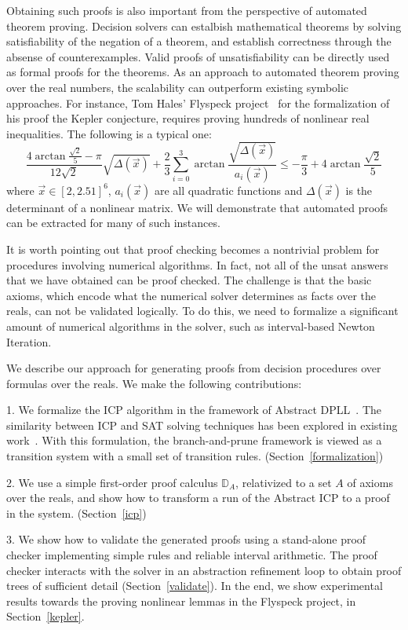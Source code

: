 \documentclass{llncs}
\begin{document}
Obtaining such proofs is also important from the perspective of automated theorem proving. Decision solvers can estalbish mathematical theorems by solving satisfiability of the negation of a theorem, and establish correctness through the absense of counterexamples. Valid proofs of unsatisfiability can be directly used as formal proofs for the theorems. As an approach to automated theorem proving over the real numbers, the scalability can outperform existing symbolic approaches. For instance, Tom Hales' Flyspeck project~\cite{DBLP:conf/dagstuhl/Hales05,DBLP:journals/dcg/HalesHMNOZ10} for the formalization of his proof the Kepler conjecture, requires proving hundreds of nonlinear real inequalities. The following is a typical one:
$$\frac{4\arctan\frac{\sqrt 2}{5}-\pi}{12\sqrt2}\sqrt{\Delta(\vec x)}+\frac{2}{3}\sum_{i=0}^3\arctan\frac{\sqrt{\Delta(\vec x)}}{a_i(\vec x)}\leq -\frac{\pi}{3}+4\arctan\frac{\sqrt 2}{5}$$
where $\vec x\in [2, 2.51]^6$,  $a_i(\vec x)$ are all quadratic functions and $\Delta(\vec x)$ is the determinant of a nonlinear matrix. We will demonstrate that automated proofs can be extracted for many of such instances. 

It is worth pointing out that proof checking becomes a nontrivial problem for procedures involving numerical algorithms. In fact, not all of the {\sf unsat} answers that we have obtained can be proof checked. The challenge is that the basic axioms, which encode what the numerical solver determines as facts over the reals, can not be validated logically. To do this, we need to formalize a significant amount of numerical algorithms in the solver, such as interval-based Newton Iteration.

We describe our approach for generating proofs from decision procedures over formulas over the reals. We make the following contributions:

1. We formalize the ICP algorithm in the framework of Abstract DPLL~\cite{DBLP:journals/jacm/NieuwenhuisOT06}. The similarity between ICP and SAT solving techniques has been explored in existing work~\cite{HySAT}. With this formulation, the branch-and-prune framework is viewed as a transition system with a small set of transition rules. (Section~\ref{formalization})

2. We use a simple first-order proof calculus $\mathbb{D}_A$, relativized to a set $A$ of axioms over the reals, and show how to transform a run of the Abstract ICP to a proof in the system. (Section~\ref{icp})

3. We show how to validate the generated proofs using a stand-alone proof checker implementing simple rules and reliable interval arithmetic. The proof checker interacts with the solver in an abstraction refinement loop to obtain proof trees of sufficient detail (Section~\ref{validate}). In the end, we show experimental results towards the proving nonlinear lemmas in the Flyspeck project, in Section~\ref{kepler}.
\end{document}
